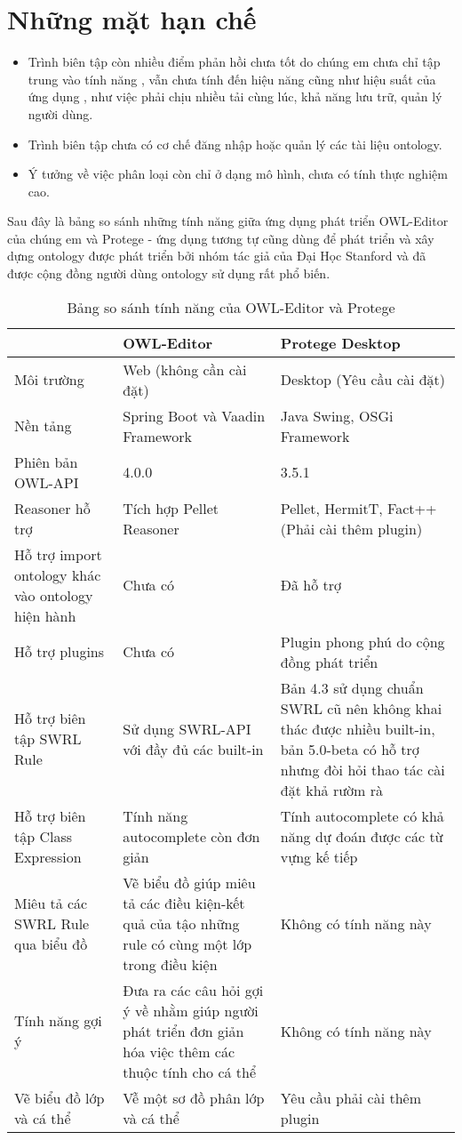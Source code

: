 \section{Những mặt hạn chế}
\begin{itemize}
\item Trình biên tập còn nhiều điểm phản hồi chưa tốt do chúng em chưa chỉ tập trung vào tính năng , vẫn chưa tính đến hiệu năng cũng như hiệu suất của ứng dụng , như việc phải chịu nhiều tải cùng lúc, khả năng lưu trữ, quản lý người dùng.
\item Trình biên tập chưa có cơ chế đăng nhập hoặc quản lý các tài liệu ontology.
\item Ý tưởng về việc phân loại còn chỉ ở dạng mô hình, chưa có tính thực nghiệm cao.
\end{itemize}
Sau đây là bảng so sánh những tính năng giữa ứng dụng phát triển OWL-Editor của chúng em và Protege - ứng dụng tương tự cũng dùng để phát triển và xây dựng ontology được phát triển bởi nhóm tác giả của Đại Học Stanford và đã được cộng đồng người dùng ontology sử dụng rất phổ biến.

\begin{table}[h!]
	\centering
	\begin{tabular}{|p{4cm}|p{5cm}|p{5cm}|}
		\hline
						& OWL-Editor & Protege Desktop \\\hline
		Môi trường		& Web (không cần cài đặt) & Desktop (Yêu cầu cài đặt) \\\hline	
		Nền tảng		& Spring Boot và Vaadin Framework & Java Swing, OSGi Framework \\\hline
		Phiên bản OWL-API & 4.0.0 &  3.5.1 \\\hline
		Reasoner hỗ trợ & Tích hợp Pellet Reasoner & Pellet, HermitT, Fact++ (Phải cài thêm plugin)\\\hline
		Hỗ trợ import ontology khác vào ontology hiện hành & Chưa có & Đã hỗ trợ \\\hline
		Hỗ trợ plugins & Chưa có & Plugin phong phú do cộng đồng phát triển \\\hline
		Hỗ trợ biên tập SWRL Rule & Sử dụng SWRL-API với đầy đủ các built-in & Bản 4.3 sử dụng chuẩn SWRL cũ nên không khai thác được nhiều built-in, bản 5.0-beta có hỗ trợ nhưng đòi hỏi thao tác cài đặt khả rườm rà \\\hline
		Hỗ trợ biên tập Class Expression & Tính năng autocomplete còn đơn giản & Tính autocomplete có khả năng dự đoán được các từ vựng kế tiếp \\\hline
		Miêu tả các SWRL Rule qua biểu đồ& Vẽ biểu đồ giúp miêu tả các điều kiện-kết quả của tậo những rule có cùng một lớp trong điều kiện & Không có tính năng này \\\hline
		Tính năng gợi ý & Đưa ra các câu hỏi gợi ý về nhằm giúp người phát triển đơn giản hóa việc thêm các thuộc tính cho cá thể & Không có tính năng này \\\hline
		Vẽ biểu đồ lớp và cá thể & Vễ một sơ đồ phân lớp và cá thể & Yêu cầu phải cài thêm plugin \\\hline
		\hline
	\end{tabular}
	\caption{Bảng so sánh tính năng của OWL-Editor và Protege \label{overflow}}  
\end{table}


